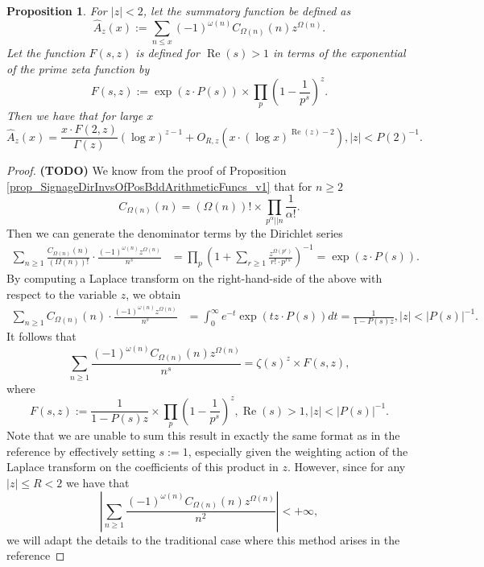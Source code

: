 \documentclass[11pt,reqno,a4letter]{article}
\numberwithin{figure}{section}
\numberwithin{table}{section}
\theoremstyle{plain}
\newtheorem{prop}[theorem]{Proposition}
\numberwithin{theorem}{section}
\theoremstyle{definition}
\renewcommand{\Re}{\operatorname{Re}}
\begin{document}
\begin{prop} 
\label{prop_HatAzx_ModSummatoryFuncExps_RelatedToCkn} 
For $|z| < 2$, let the summatory function be defined as 
\[
\widehat{A}_z(x) := \sum_{n \leq x} (-1)^{\omega(n)} 
     C_{\Omega(n)}(n) z^{\Omega(n)}. 
\]
Let the function $F(s, z)$ is defined for $\Re(s) > 1$ in terms of the 
exponential of the prime zeta function by 
\[
F(s, z) := \exp\left(z \cdot P(s)\right) 
     \times \prod_p \left(1 - \frac{1}{p^s}\right)^{z}. 
\]
Then we have that for large $x$ 
\[
\widehat{A}_z(x) = \frac{x \cdot F(2, z)}{\Gamma(z)} (\log x)^{z-1} + 
     O_{R,z}\left(x \cdot (\log x)^{\Re(z) - 2}\right), |z| < P(2)^{-1}. 
\]
\end{prop} 
\begin{proof} 
\textbf{(TODO)} 
We know from the proof of 
Proposition \ref{prop_SignageDirInvsOfPosBddArithmeticFuncs_v1} that for $n \geq 2$ 
\[
C_{\Omega(n)}(n) = (\Omega(n))! \times \prod_{p^{\alpha}||n} \frac{1}{\alpha!}. 
\]
Then we can generate the denominator terms by the Dirichlet series 
\begin{align*} 
\sum_{n \geq 1} \frac{C_{\Omega(n)}(n)}{(\Omega(n))!} \cdot 
     \frac{(-1)^{\omega(n)} z^{\Omega(n)}}{n^s} & = \prod_p \left(1 + \sum_{r \geq 1} 
     \frac{z^{\Omega(p^r)}}{r! \cdot p^{rs}}\right)^{-1} 
     = \exp\left(z \cdot P(s)\right). 
\end{align*} 
By computing a Laplace transform on the right-hand-side of the above with 
respect to the variable $z$, we obtain 
\begin{align*} 
\sum_{n \geq 1} C_{\Omega(n)}(n) \cdot \frac{(-1)^{\omega(n)} z^{\Omega(n)}}{n^s} & = 
     \int_0^{\infty} e^{-t} \exp\left(tz \cdot P(s)\right) dt = \frac{1}{1 - P(s) z}, 
     |z| < |P(s)|^{-1}. 
\end{align*} 
It follows that 
\[
\sum_{n \geq 1} \frac{(-1)^{\omega(n)} C_{\Omega(n)}(n) z^{\Omega(n)}}{n^s} = 
     \zeta(s)^z \times F(s, z), 
\]
where 
\[
F(s, z) := \frac{1}{1-P(s) z} \times \prod_p \left(1 - \frac{1}{p^s}\right)^{z}, 
     \Re(s) > 1, |z| < |P(s)|^{-1}. 
\]
Note that we are unable to sum this result in exactly the same format as in the 
reference \cite[\S 7.4; Thm.\ 7.18]{MV} by effectively setting $s := 1$, especially 
given the weighting action of the Laplace transform on the coefficients of this 
product in $z$. 
However, since for any $|z| \leq R < 2$ we have that 
\[
\left\lvert \sum_{n \geq 1} \frac{(-1)^{\omega(n)} C_{\Omega(n)}(n) z^{\Omega(n)}}{n^2} 
     \right\rvert < +\infty, 
\]
we will adapt the details to the traditional case where this method arises in the reference 

\end{proof}
\end{document}
